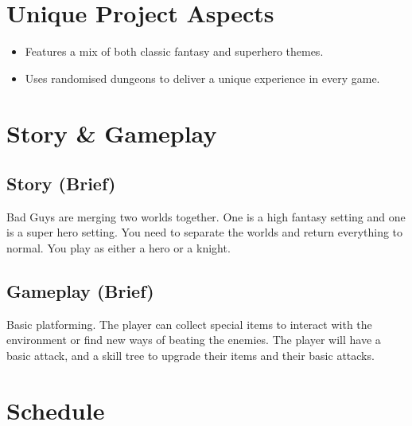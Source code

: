 \documentclass[titlepage]{article}
\begin{document}
\section{Unique Project Aspects}
\begin{itemize}
	\item Features a mix of both classic fantasy and superhero themes.
	\item Uses randomised dungeons to deliver a unique experience in every game.
\end{itemize}

\section{Story \& Gameplay}
\subsection*{Story (Brief)}
Bad Guys are merging two worlds together. One is a high fantasy setting and one is a super hero setting. You need to separate the worlds and return everything to normal. You play as either a hero or a knight. 

\subsection*{Gameplay (Brief)}
Basic platforming. The player can collect special items to interact with the environment or find new ways of beating the enemies. The player will have a basic attack, and a skill tree to upgrade their items and their basic attacks. 

\section{Schedule}

\end{document}
